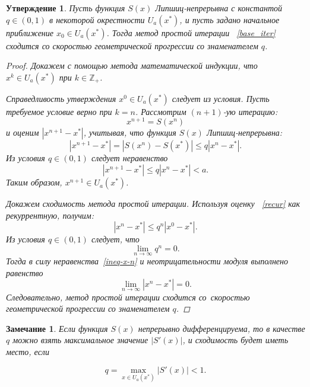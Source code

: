 \documentclass[11pt,a4paper,twoside]{report}
\numberwithin{equation}{section}
\newtheorem*{statement}{Утверждение}
\theoremstyle{definition}
\theoremstyle{plain}
\newtheorem*{note*}{Замечание}
\begin{document}
\begin{statement}
%
    Пусть функция $S(x)$ Липшиц-непрерывна с константой $q \in (0,1)$ в некоторой
    окрестности $U_a(x^*)$, и пусть
    задано начальное приближение $x_0\in U_a(x^*)$. Тогда метод простой итерации
   ~\eqref{base_iter} сходится со скоростью геометрической прогрессии со
    знаменателем $q$.
    \begin{proof}
        Докажем с помощью метода математической индукции, что
        $x^k \in U_a(x^*)$ при $k \in \mathbb{Z}_+$.

        Справедливость утверждения $x^0 \in U_a(x^*)$ следует из условия.
        Пусть требуемое условие верно при $k=n$. Рассмотрим $(n+1)$-ую итерацию:
        $$
            x^{n+1} = S(x^n)
        $$
        и оценим $|x^{n+1} - x^*|$, учитывая, что функция $S(x)$
        Липшиц-непрерывна:
        \begin{equation}
            \label{recur}
            |x^{n+1} - x^*| = |S(x^n) - S(x^*)| \leqslant q|x^n - x^*|.
        \end{equation}
        Из условия $q \in (0,1)$ следует неравенство
        $$
            |x^{n+1} - x^*| \leqslant q|x^n - x^*| < a.
        $$
        Таким образом, $x^{n+1} \in U_a(x^*)$.

        Докажем сходимость метода простой итерации. Используя оценку
       ~\eqref{recur} как рекуррентную, получим:
        \begin{equation}
            \label{ineq-x-n}
            |x^n - x^*| \leqslant q^n|x^0 - x^*|.
        \end{equation}
        Из условия $q \in (0,1)$ следует, что
        $$
            \lim_{n\rightarrow \infty}q^n = 0.
        $$
        Тогда в силу неравенства~\eqref{ineq-x-n} и неотрицательности модуля
        выполнено равенство
        $$
            \lim_{n\rightarrow \infty}\left|x^n - x^*\right| = 0.
        $$
        Следовательно, метод простой итерации сходится со~скоростью
        геометрической прогрессии со знаменателем $q$.
    \end{proof}
%
\end{statement}
%
%
\begin{note*}
%
    Если функция $S(x)$ непрерывно дифференцируема, то в качестве $q$ можно
    взять максимальное значение $\left|S'(x)\right|$, и сходимость будет иметь место, если

    $$
        q = \max_{x \in U_a(x^*)} \left|S'(x)\right| < 1.
    $$
%
\end{note*}
%
\end{document}
